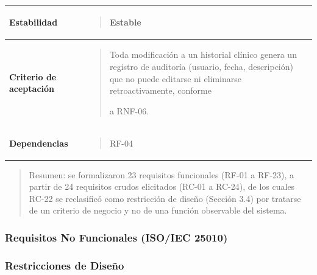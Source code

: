 \documentclass[
]{article}
\newcounter{none} %
\begin{document}
{\def\LTcaptype{none} %
\begin{longtable}[]{@{}
  >{\raggedright\arraybackslash}p{}
  >{\raggedright\arraybackslash}p{}@{}}
\toprule\noalign{}
\begin{minipage}[b]{\linewidth}\raggedright
\textbf{Estabilidad}
\end{minipage} & \begin{minipage}[b]{\linewidth}\raggedright
\begin{quote}
Estable
\end{quote}
\end{minipage} \\
\midrule\noalign{}
\endhead
\bottomrule\noalign{}
\endlastfoot
\textbf{Criterio de aceptación} &
\begin{minipage}[t]{\linewidth}\raggedright
\begin{quote}
Toda modificación a un historial clínico genera un registro de auditoría
(usuario, fecha, descripción) que no puede editarse ni eliminarse
retroactivamente, conforme

a RNF-06.
\end{quote}
\end{minipage} \\
\textbf{Dependencias} & \begin{minipage}[t]{\linewidth}\raggedright
\begin{quote}
RF-04
\end{quote}
\end{minipage} \\
\end{longtable}
}

\begin{quote}
Resumen: se formalizaron 23 requisitos funcionales (RF-01 a RF-23), a
partir de 24 requisitos crudos elicitados (RC-01 a RC-24), de los cuales
RC-22 se reclasificó como restricción de diseño (Sección 3.4) por
tratarse de un criterio de negocio y no de una función observable del
sistema.
\end{quote}

\subsubsection{Requisitos No Funcionales (ISO/IEC
25010)}\label{requisitos-no-funcionales-isoiec-25010}

\subsubsection{Restricciones de
Diseño}\label{restricciones-de-diseuxf1o}
\end{document}
